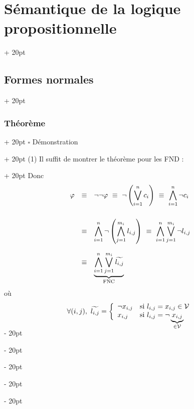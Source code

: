 \documentclass[a4paper, 12pt, twoside]{article}
\newcommand{\lr}[1]{\left( #1 \right)}
\newcommand{\ind}[1][20pt]{\advance\leftskip + #1}
\newcommand{\deind}[1][20pt]{\advance\leftskip - #1}
\newenvironment{indt}[2][20pt]{#2 \par \ind[#1]}{\par \deind} %
\begin{document}
\begin{indt}{\section{Sémantique de la logique propositionnelle}}
\begin{indt}{\subsection{Formes normales}}
\begin{indt}{\subsubsection{Théorème}}
\begin{indt}{$\square$ Démonstration}
\begin{indt}{(1) Il suffit de montrer le théorème pour les FND :}
                        Donc
                            \[
                                \begin{array}{rcl}
                                    \varphi
                                    &\equiv& \neg \neg \varphi
                                    \vspace{6pt}
                                    \ \equiv\ \displaystyle \neg \lr{\bigvee_{i = 1}^n c_i}
                                    \vspace{6pt}
                                    \ \equiv\ \displaystyle \bigwedge_{i = 1}^n \neg c_i
                                    \vspace{6pt}
                                    \\
                                    &\equiv& \displaystyle \bigwedge_{i = 1}^n \neg \lr{\bigwedge_{j = 1}^{m_i} l_{i, j}}
                                    \vspace{6pt}
                                    \ \equiv\ \displaystyle \bigwedge_{i = 1}^n \bigvee_{j = 1}^{m_i} \neg l_{i, j}
                                    \vspace{6pt}
                                    \\
                                    &\equiv& \displaystyle \underbrace{\bigwedge_{i = 1}^n \bigvee_{j = 1}^{m_i} \widetilde{l_{i, j}}}_{\text{FNC}}
                                \end{array}
                            \]
                        où
                            \[
                                \forall (i, j),\ \widetilde{l_{i, j}} =
                                \left\{
                                \begin{array}{ll}
                                    \neg x_{i, j} & \text{si $l_{i ,j} = x_{i ,j} \in \mathcal V$}
                                    \\
                                    x_{i ,j} & \text{si $l_{i ,j} = \neg \underbrace{x_{i, j}}_{\in \mathcal V}$}
                                    \vspace{-12pt}
                                \end{array}
                                \right.
                            \]
                    \end{indt}
                    
                    \newpage
                    

\end{indt}
\end{indt}
\end{indt}
\end{indt}
\end{document}
